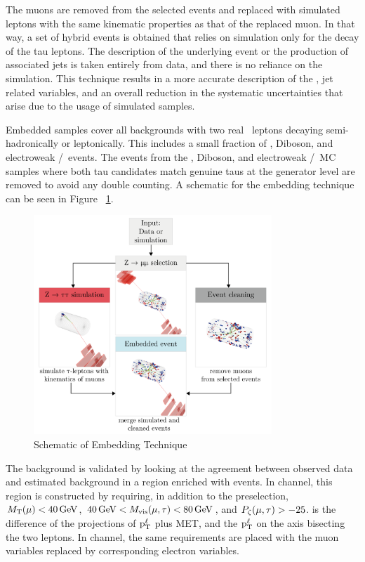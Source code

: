 The muons are removed from the selected events and replaced with simulated \Pgt\, leptons with the same kinematic properties as that of the replaced muon. In that way, a set of hybrid events is obtained that relies on simulation only for the decay of the tau leptons. The description of the underlying event or the production of associated jets is taken entirely from data, and there is no reliance on the simulation. This technique results in a more accurate description of the \ptvecmiss, jet related variables, and an overall reduction in the systematic uncertainties that arise due to the usage of simulated samples.

Embedded samples cover all backgrounds with two real \Pgt\, leptons decaying semi-hadronically or leptonically. This includes a small fraction of \ttbar, Diboson, and electroweak \PW/\PZ\, events. The events from the \ttbar, Diboson, and electroweak \PW/\PZ\, MC samples where both tau candidates match genuine taus at the generator level are removed to avoid any double counting. A schematic for the embedding technique can be seen in Figure ~\ref{fig:embedding}.

\begin{figure}[htbp!]
  \centering
  \includegraphics[width=0.8\textwidth]{plots/chapter7/emb.png}
  \caption{Schematic of Embedding Technique}
  \label{fig:embedding}
\end{figure}

The \Ztt background is validated by looking at the agreement between observed data and estimated background in a region enriched with \Ztt events. In \Hmuhad channel, this region is constructed by requiring, in addition to the preselection, $M_\mathrm{T}(\mu) < 40\,\text{Ge\hspace{-.08em}V}$, $40\,\text{Ge\hspace{-.08em}V} < M_{\text{vis}}(\mu, \tau) < 80\,\text{Ge\hspace{-.08em}V}$, and $P_{\zeta}(\mu, \tau) > -25$. \pzeta is the difference of the projections of $\text{p}_\text{T}^{\ell}$ plus MET, and the $\text{p}_\text{T}^{\ell}$ on the axis bisecting the two leptons. In \Hehad channel, the same requirements are placed with the muon variables replaced by corresponding electron variables.

